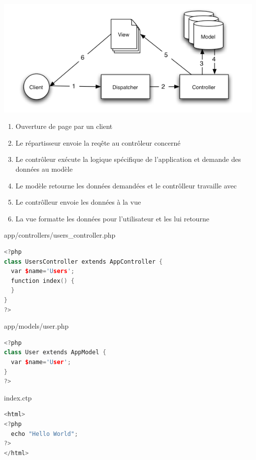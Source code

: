 \begin{frame}
\begin{center}
\includegraphics[scale=0.50]{img/basic_mvc.png}

\begin{enumerate}
  \item Ouverture de page par un client
  \item Le répartisseur envoie la reqête au contrôleur concerné
  \item Le contrôleur exécute la logique spécifique de l’application et demande des données au modèle
  \item Le modèle retourne les données demandées et le contrôlleur travaille avec
  \item Le contrôlleur envoie les données à la vue
  \item La vue formatte les données pour l'utilisateur et les lui retourne
\end{enumerate}
\end{center}
\end{frame}

\begin{frame}[fragile]{app/controllers/users\_controller.php}
\begin{lstlisting}[language=c++]
<?php
class UsersController extends AppController {
  var $name='Users';
  function index() {
  }
}
?>
\end{lstlisting}
\end{frame}

\begin{frame}[fragile]{app/models/user.php}
\begin{lstlisting}[language=c++]
<?php
class User extends AppModel {
  var $name='User';
}
?>
\end{lstlisting}
\end{frame}

\begin{frame}[fragile]{index.ctp}
\begin{lstlisting}[language=c++]
<html>
<?php
  echo "Hello World";
?>
</html>
\end{lstlisting}
\end{frame}



